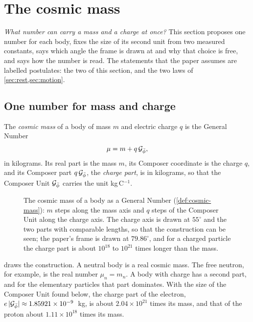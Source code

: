 \section{The cosmic mass}\label{sec:cosmic-mass}

\emph{What number can carry a mass and a charge at once?} This section proposes one number for each body, fixes the size of its second unit from two measured constants, says which angle the frame is drawn at and why that choice is free, and says how the number is read. The statements that the paper assumes are labelled postulates: the two of this section, and the two laws of \cref{sec:rest,sec:motion}.

\subsection{One number for mass and charge}\label{subsec:cm-def}

\begin{postulate}\label{def:cosmic-mass}
The \emph{cosmic mass} of a body of mass $m$ and electric charge $q$ is the General Number
\[
\mu = m + q\,\mathcal{G}_{\bar{\phi}} ,
\]
in kilograms. Its real part is the mass $m$, its Composer coordinate is the charge $q$, and its Composer part $q\,\mathcal{G}_{\bar{\phi}}$, the \emph{charge part}, is in kilograms, so that the Composer Unit $\mathcal{G}_{\bar{\phi}}$ carries the unit kg\,C$^{-1}$.
\end{postulate}

\begin{figure}[t]
\centering

\caption{The cosmic mass of a body as a General Number (\cref{def:cosmic-mass}): $m$ steps along the mass axis and $q$ steps of the Composer Unit along the charge axis. The charge axis is drawn at $55^\circ$ and the two parts with comparable lengths, so that the construction can be seen; the paper's frame is drawn at $79.86^\circ$, and for a charged particle the charge part is about $10^{18}$ to $10^{21}$ times longer than the mass.}
\label{fig:cosmic-mass}
\end{figure}

 draws the construction. A neutral body is a real cosmic mass. The free neutron, for example, is the real number $\mu_n = m_n$. A body with charge has a second part, and for the elementary particles that part dominates. With the size of the Composer Unit found below, the charge part of the electron, $e\,\lvert\mathcal{G}_{\bar{\phi}}\rvert \approx 1.85921 \times 10^{-9}$~kg, is about $2.04 \times 10^{21}$ times its mass, and that of the proton about $1.11 \times 10^{18}$ times its mass.

